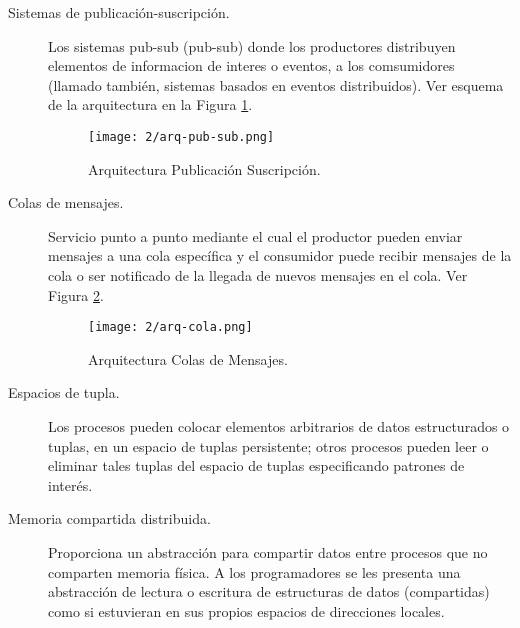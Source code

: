 \begin{description}
\begin{description}
		\item[Sistemas de publicaci\'on-suscripci\'on.]  Los sistemas pub-sub (\gls{pub-sub})  donde los productores   distribuyen elementos de informacion de interes o eventos, a los comsumidores (llamado tambi\'en, sistemas basados en eventos distribuidos). Ver esquema de la arquitectura en la Figura \ref{fig:Arq-pubsub}.     
		
		\begin{figure}[h]
			  \begin{center}%
			\texttt{[image: 2/arq-pub-sub.png]}
			\caption{Arquitectura Publicaci\'on Suscripci\'on. }
			\label{fig:Arq-pubsub}
		 \end{center} 
	 \end{figure} 
		
		
		\item[Colas de mensajes.]  Servicio punto a punto mediante el cual el productor pueden enviar mensajes a una cola específica y el consumidor puede recibir mensajes de la cola o ser notificado de la llegada de nuevos mensajes en el cola.
		Ver Figura \ref{fig:Arq-cola}.
		
		\begin{figure}[h] 
			\begin{center}%
			\texttt{[image: 2/arq-cola.png]}
			\caption{Arquitectura Colas de Mensajes.}
			\label{fig:Arq-cola}
		 \end{center} 
	 \end{figure} 
		
		\item[Espacios de tupla.] Los procesos pueden colocar elementos arbitrarios de datos estructurados o tuplas, en un espacio de tuplas persistente;  otros procesos pueden leer o eliminar tales tuplas del espacio de tuplas especificando patrones de interés.    
		
		\item[Memoria compartida distribuida.]  Proporciona un abstracción para compartir datos entre procesos que no comparten memoria física. A los programadores se les presenta una abstracción  de lectura o escritura de estructuras de datos (compartidas) como si estuvieran en sus propios espacios de direcciones locales.   
		
	\end{description} 	 	
	
\end{description}


